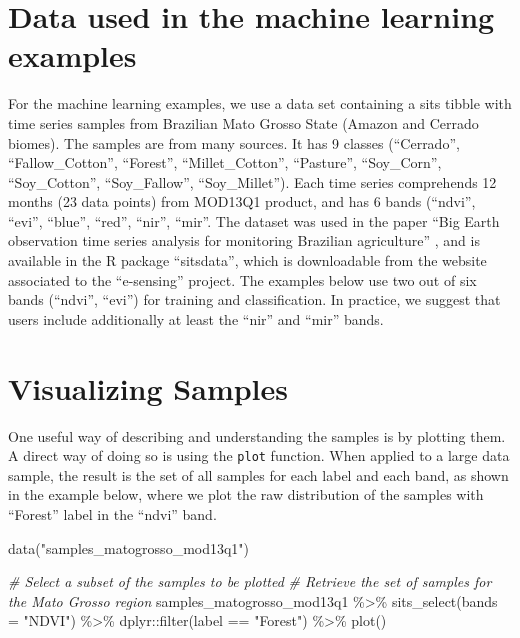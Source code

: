 \documentclass[a4paper,]{tufte-book}
\newenvironment{Shaded}{}{}
\newcommand{\AttributeTok}[1]{\textcolor[rgb]{0.49,0.56,0.16}{#1}}
\newcommand{\CommentTok}[1]{\textcolor[rgb]{0.38,0.63,0.69}{\textit{#1}}}
\newcommand{\FunctionTok}[1]{\textcolor[rgb]{0.02,0.16,0.49}{#1}}
\newcommand{\NormalTok}[1]{#1}
\newcommand{\SpecialCharTok}[1]{\textcolor[rgb]{0.25,0.44,0.63}{#1}}
\newcommand{\StringTok}[1]{\textcolor[rgb]{0.25,0.44,0.63}{#1}}
\begin{document}
\hypertarget{data-used-in-the-machine-learning-examples}{%
\section{Data used in the machine learning examples}\label{data-used-in-the-machine-learning-examples}}

For the machine learning examples, we use a data set containing a sits tibble with time series samples from Brazilian Mato Grosso State (Amazon and Cerrado biomes). The samples are from many sources. It has 9 classes (``Cerrado'', ``Fallow\_Cotton'', ``Forest'', ``Millet\_Cotton'', ``Pasture'', ``Soy\_Corn'', ``Soy\_Cotton'', ``Soy\_Fallow'', ``Soy\_Millet''). Each time series comprehends 12 months (23 data points) from MOD13Q1 product, and has 6 bands (``ndvi'', ``evi'', ``blue'', ``red'', ``nir'', ``mir''. The dataset was used in the paper ``Big Earth observation time series analysis for monitoring Brazilian agriculture'' \citep{Picoli2018}, and is available in the R package ``sitsdata'', which is downloadable from the website associated to the ``e-sensing'' project. The examples below use two out of six bands (``ndvi'', ``evi'') for training and classification. In practice, we suggest that users include additionally at least the ``nir'' and ``mir'' bands.

\hypertarget{visualizing-samples}{%
\section{Visualizing Samples}\label{visualizing-samples}}

One useful way of describing and understanding the samples is by plotting them. A direct way of doing so is using the \texttt{plot} function. When applied to a large data sample, the result is the set of all samples for each label and each band, as shown in the example below, where we plot the raw distribution of the samples with ``Forest'' label in the ``ndvi'' band.

\begin{Shaded}
\begin{Highlighting}[]
\FunctionTok{data}\NormalTok{(}\StringTok{"samples\_matogrosso\_mod13q1"}\NormalTok{)}

\CommentTok{\# Select a subset of the samples to be plotted}
\CommentTok{\# Retrieve the set of samples for the Mato Grosso region }
\NormalTok{samples\_matogrosso\_mod13q1 }\SpecialCharTok{\%\textgreater{}\%} 
    \FunctionTok{sits\_select}\NormalTok{(}\AttributeTok{bands =} \StringTok{"NDVI"}\NormalTok{) }\SpecialCharTok{\%\textgreater{}\%} 
\NormalTok{    dplyr}\SpecialCharTok{::}\FunctionTok{filter}\NormalTok{(label }\SpecialCharTok{==} \StringTok{"Forest"}\NormalTok{) }\SpecialCharTok{\%\textgreater{}\%} 
    \FunctionTok{plot}\NormalTok{()}
\end{Highlighting}
\end{Shaded}
\end{document}
